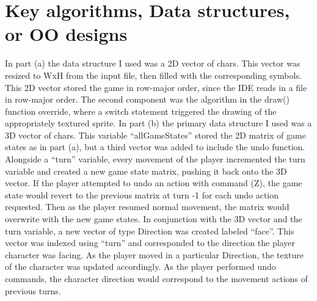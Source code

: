 \documentclass[12pt]{article}
\begin{document}
\section[2]{Key algorithms, Data structures, or OO designs}
\hfill\begin{minipage}{\dimexpr\textwidth-1cm}
In part (a) the data structure I used was a 2D vector of chars. This vector was resized to WxH from the input file, then filled with the corresponding symbols. This 2D vector stored the game in row-major order, since the IDE reads in a file in row-major order. The second component was the algorithm in the draw() function override, where a switch statement triggered the drawing of the appropriately textured sprite. \newline
In part (b) the primary data structure I used was a 3D vector of chars. This variable “allGameStates” stored the 2D matrix of game states as in part (a), but a third vector was added to include the undo function. Alongside a “turn” variable, every movement of the player incremented the turn variable and created a new game state matrix, pushing it back onto the 3D vector. If the player attempted to undo an action with command (Z), the game state would revert to the previous matrix at turn -1 for each undo action requested. Then as the player resumed normal movement, the matrix would overwrite with the new game states. \newline
In conjunction with the 3D vector and the turn variable, a new vector of type Direction was created labeled “face”. This vector was indexed using “turn” and corresponded to the direction the player character was facing. As the player moved in a particular Direction, the texture of the character was updated accordingly. As the player performed undo commands, the character direction would correspond to the movement actions of previous turns.
\end{minipage}
\end{document}
